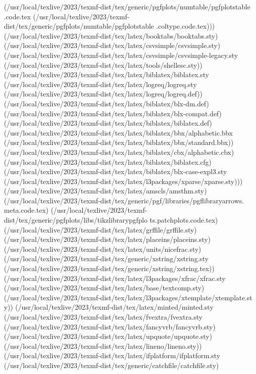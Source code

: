 (/usr/local/texlive/2023/texmf-dist/tex/generic/pgfplots/numtable/pgfplotstable
.code.tex
(/usr/local/texlive/2023/texmf-dist/tex/generic/pgfplots/numtable/pgfplotstable
.coltype.code.tex)))
(/usr/local/texlive/2023/texmf-dist/tex/latex/booktabs/booktabs.sty)
(/usr/local/texlive/2023/texmf-dist/tex/latex/csvsimple/csvsimple.sty)
(/usr/local/texlive/2023/texmf-dist/tex/latex/csvsimple/csvsimple-legacy.sty
(/usr/local/texlive/2023/texmf-dist/tex/latex/tools/shellesc.sty))
(/usr/local/texlive/2023/texmf-dist/tex/latex/biblatex/biblatex.sty
(/usr/local/texlive/2023/texmf-dist/tex/latex/logreq/logreq.sty
(/usr/local/texlive/2023/texmf-dist/tex/latex/logreq/logreq.def))
(/usr/local/texlive/2023/texmf-dist/tex/latex/biblatex/blx-dm.def)
(/usr/local/texlive/2023/texmf-dist/tex/latex/biblatex/blx-compat.def)
(/usr/local/texlive/2023/texmf-dist/tex/latex/biblatex/biblatex.def)
(/usr/local/texlive/2023/texmf-dist/tex/latex/biblatex/bbx/alphabetic.bbx
(/usr/local/texlive/2023/texmf-dist/tex/latex/biblatex/bbx/standard.bbx))
(/usr/local/texlive/2023/texmf-dist/tex/latex/biblatex/cbx/alphabetic.cbx)
(/usr/local/texlive/2023/texmf-dist/tex/latex/biblatex/biblatex.cfg)
(/usr/local/texlive/2023/texmf-dist/tex/latex/biblatex/blx-case-expl3.sty
(/usr/local/texlive/2023/texmf-dist/tex/latex/l3packages/xparse/xparse.sty)))
(/usr/local/texlive/2023/texmf-dist/tex/latex/amscls/amsthm.sty)
(/usr/local/texlive/2023/texmf-dist/tex/generic/pgf/libraries/pgflibraryarrows.
meta.code.tex)
(/usr/local/texlive/2023/texmf-dist/tex/generic/pgfplots/libs/tikzlibrarypgfplo
ts.patchplots.code.tex)
(/usr/local/texlive/2023/texmf-dist/tex/latex/grffile/grffile.sty)
(/usr/local/texlive/2023/texmf-dist/tex/latex/placeins/placeins.sty)
(/usr/local/texlive/2023/texmf-dist/tex/latex/units/nicefrac.sty)
(/usr/local/texlive/2023/texmf-dist/tex/generic/xstring/xstring.sty
(/usr/local/texlive/2023/texmf-dist/tex/generic/xstring/xstring.tex))
(/usr/local/texlive/2023/texmf-dist/tex/latex/l3packages/xfrac/xfrac.sty
(/usr/local/texlive/2023/texmf-dist/tex/latex/base/textcomp.sty)
(/usr/local/texlive/2023/texmf-dist/tex/latex/l3packages/xtemplate/xtemplate.st
y)) (/usr/local/texlive/2023/texmf-dist/tex/latex/minted/minted.sty
(/usr/local/texlive/2023/texmf-dist/tex/latex/fvextra/fvextra.sty
(/usr/local/texlive/2023/texmf-dist/tex/latex/fancyvrb/fancyvrb.sty)
(/usr/local/texlive/2023/texmf-dist/tex/latex/upquote/upquote.sty)
(/usr/local/texlive/2023/texmf-dist/tex/latex/lineno/lineno.sty))
(/usr/local/texlive/2023/texmf-dist/tex/latex/ifplatform/ifplatform.sty
(/usr/local/texlive/2023/texmf-dist/tex/generic/catchfile/catchfile.sty)
